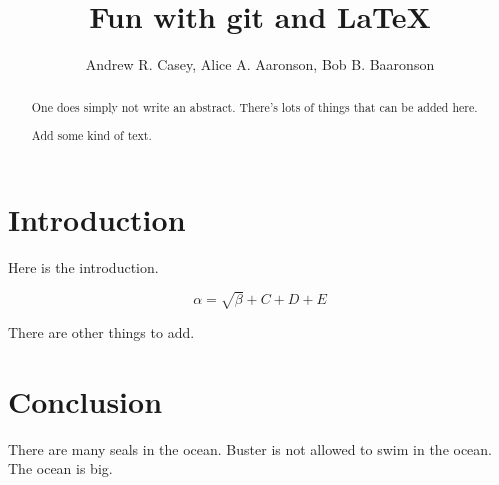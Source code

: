 \documentclass{article}
\begin{document}
\title{Fun with git and \LaTeX{}}
\author{Andrew R. Casey, Alice A. Aaronson, Bob B. Baaronson}

\maketitle

\begin{abstract}
One does simply not write an abstract. There's lots of things that can be added here.

Add some kind of text.
\end{abstract}

\section{Introduction}
Here is the introduction.

\begin{equation}
    \label{simple_equation}
    \alpha = \sqrt{ \beta } + C + D + E
\end{equation}

There are other things to add.

\section{Conclusion}
There are many seals in the ocean. Buster is not allowed to swim in the ocean. The ocean is big.
\end{document}
